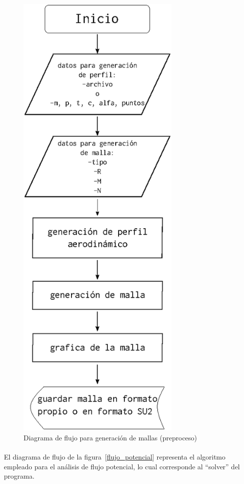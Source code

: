 \documentclass[letterpaper, openright, 12pt]{book}
\begin{document}
    \begin{figure}[htbp!]
        \centering
        \includegraphics[keepaspectratio, width=80mm]{./Imagenes/flujo_malla}
        \caption{Diagrama de flujo para generación de mallas (preproceso)}
        \label{flujo_malla}
    \end{figure}

    \paragraph*{}
        El diagrama de flujo de la figura~\ref{flujo_potencial} representa el
        algoritmo empleado para el análisis de flujo potencial, lo cual
        corresponde al ``solver'' del programa.
\end{document}
